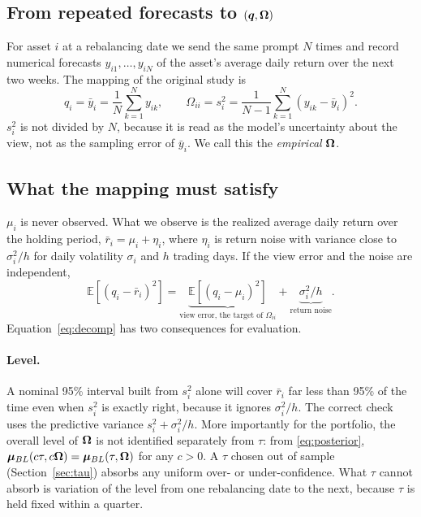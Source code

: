 \subsection{From repeated forecasts to \texorpdfstring{$(\bm{q}, \bm{\Omega})$}{(q, Omega)}}
For asset $i$ at a rebalancing date we send the same prompt $N$ times and record numerical forecasts $y_{i1},\dots,y_{iN}$ of the asset's average daily return over the next two weeks. The mapping of the original study is
\begin{equation}\label{eq:mapping}
  q_i = \bar y_i = \frac{1}{N}\sum_{k=1}^N y_{ik}, \qquad \Omega_{ii} = s_i^2 = \frac{1}{N-1}\sum_{k=1}^N (y_{ik}-\bar y_i)^2 .
\end{equation}
$s_i^2$ is not divided by $N$, because it is read as the model's uncertainty about the view, not as the sampling error of $\bar y_i$. We call this the \emph{empirical} $\bm{\Omega}$.

\subsection{What the mapping must satisfy}\label{sec:requirements}
$\mu_i$ is never observed. What we observe is the realized average daily return over the holding period, $\bar r_i = \mu_i + \eta_i$, where $\eta_i$ is return noise with variance close to $\sigma_i^2/h$ for daily volatility $\sigma_i$ and $h$ trading days. If the view error and the noise are independent,
\begin{equation}\label{eq:decomp}
  \mathbb{E}\left[(q_i - \bar r_i)^2\right] = \underbrace{\mathbb{E}\left[(q_i-\mu_i)^2\right]}_{\text{view error, the target of } \Omega_{ii}} + \underbrace{\sigma_i^2/h}_{\text{return noise}} .
\end{equation}
Equation~\eqref{eq:decomp} has two consequences for evaluation.

\paragraph{Level.} A nominal 95\% interval built from $s_i^2$ alone will cover $\bar r_i$ far less than 95\% of the time even when $s_i^2$ is exactly right, because it ignores $\sigma_i^2/h$. The correct check uses the predictive variance $s_i^2 + \sigma_i^2/h$. More importantly for the portfolio, the overall level of $\bm{\Omega}$ is not identified separately from $\tau$: from \eqref{eq:posterior}, $\bm{\mu}_{BL}(c\tau, c\bm{\Omega}) = \bm{\mu}_{BL}(\tau,\bm{\Omega})$ for any $c>0$. A $\tau$ chosen out of sample (Section~\ref{sec:tau}) absorbs any uniform over- or under-confidence. What $\tau$ cannot absorb is variation of the level from one rebalancing date to the next, because $\tau$ is held fixed within a quarter.

